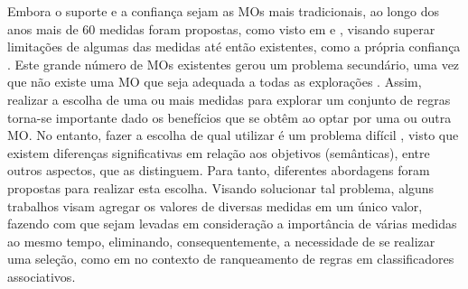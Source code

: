 Embora o suporte e a confiança sejam as MOs mais tradicionais, ao longo dos anos mais de 60 medidas foram propostas, como visto em  e , visando superar limitações de algumas das medidas até então existentes, como a própria confiança \cite{Tan2020}. Este grande número de MOs existentes gerou um problema secundário, uma vez que não existe uma MO que seja adequada a todas as explorações \cite{DBLP:conf/dawak/SharmaKPYD20}. Assim, realizar a escolha de uma ou mais medidas para explorar um conjunto de regras torna-se importante dado os benefícios que se obtêm ao optar por uma ou outra MO. No entanto, fazer a escolha de qual utilizar é um problema difícil \cite{luna2018, DBLP:conf/dawak/SharmaKPYD20}, visto que existem diferenças significativas em relação aos objetivos (semânticas), entre outros aspectos, que as distinguem. Para tanto, diferentes abordagens foram propostas para realizar esta escolha. Visando solucionar tal problema, alguns trabalhos visam agregar os valores de diversas medidas em um único valor, fazendo com que sejam levadas em consideração a importância de várias medidas ao mesmo tempo, eliminando, consequentemente, a necessidade de se realizar uma seleção, como em  no contexto de ranqueamento de regras em classificadores associativos.
